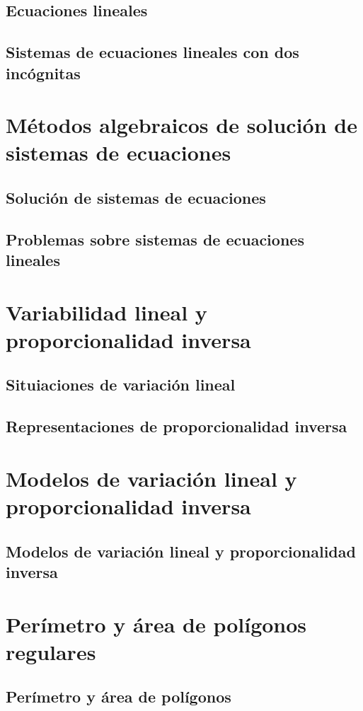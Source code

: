 \documentclass[11pt]{book}
\begin{document}
\subsection{Ecuaciones lineales}
\subsection{Sistemas de ecuaciones lineales con dos inc\'ognitas}

\section{M\'etodos algebraicos de soluci\'on de sistemas de ecuaciones}
\subsection{Soluci\'on de sistemas de ecuaciones}
\subsection{Problemas sobre sistemas de ecuaciones lineales}

\section{Variabilidad lineal y proporcionalidad inversa}
\subsection{Situiaciones de variación lineal}
\subsection{Representaciones de proporcionalidad inversa}

\section{Modelos de variación lineal y proporcionalidad inversa}
\subsection{Modelos de variación lineal y proporcionalidad inversa}

\section{Per\'imetro y \'area de pol\'igonos regulares}
\subsection{Per\'imetro y \'area de pol\'igonos}
\end{document}
